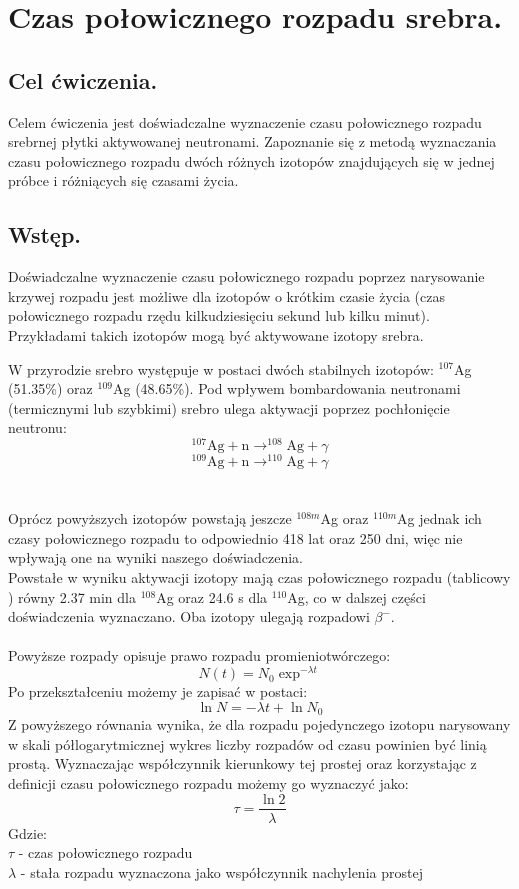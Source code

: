 \documentclass{article}
\begin{document}
\section{Czas połowicznego rozpadu srebra.}
\subsection{Cel ćwiczenia.}
   Celem ćwiczenia jest doświadczalne wyznaczenie czasu połowicznego rozpadu srebrnej płytki aktywowanej neutronami.
   Zapoznanie się z metodą wyznaczania czasu połowicznego rozpadu dwóch różnych izotopów znajdujących się w jednej próbce i różniących się czasami życia.

\subsection{Wstęp.}
Doświadczalne wyznaczenie czasu połowicznego rozpadu poprzez narysowanie krzywej rozpadu jest możliwe dla izotopów o krótkim czasie życia (czas połowicznego rozpadu rzędu kilkudziesięciu sekund lub kilku minut).
Przykładami takich izotopów mogą być aktywowane izotopy srebra.

W przyrodzie srebro występuje w postaci dwóch stabilnych izotopów: $^{107}$Ag (51.35\%) oraz $^{109}$Ag (48.65\%). Pod wpływem bombardowania neutronami (termicznymi lub szybkimi) srebro ulega aktywacji poprzez pochłonięcie neutronu:\\
\[^{107}\text{Ag} + \text{n} \to ^{108}\text{Ag} + \gamma
\]
\[^{109}\text{Ag} + \text{n} \to ^{110}\text{Ag} + \gamma
\]\\\\
Oprócz powyższych izotopów powstają jeszcze $^{108m}$Ag oraz $^{110m}$Ag jednak ich czasy połowicznego rozpadu to odpowiednio 418 lat oraz 250 dni, więc nie wpływają one na wyniki naszego doświadczenia.\\
Powstałe w wyniku aktywacji izotopy mają czas połowicznego rozpadu (tablicowy \cite{1}) równy 2.37 min dla $^{108}$Ag oraz 24.6 s dla $^{110}$Ag, co w dalszej części doświadczenia wyznaczano. Oba izotopy ulegają rozpadowi $\beta ^-$. \\\\
Powyższe rozpady opisuje prawo rozpadu promieniotwórczego:
\begin{equation}
N(t) = N_0 \exp^{-\lambda t}
\end{equation}
Po przekształceniu możemy je zapisać w postaci:
\begin{equation}
\ln N = -\lambda t + \ln N_0
\label{wz_rozpad_log}
\end{equation}
Z powyższego równania wynika, że dla rozpadu pojedynczego izotopu narysowany w skali półlogarytmicznej wykres liczby rozpadów od czasu powinien być linią prostą. Wyznaczając współczynnik kierunkowy tej prostej oraz korzystając z definicji czasu połowicznego rozpadu możemy go wyznaczyć jako:
\begin{equation}
\tau = \frac{\ln 2}{\lambda}
\label{wz_tau}
\end{equation}
Gdzie:\\
$\tau$ - czas połowicznego rozpadu\\
$\lambda $ - stała rozpadu wyznaczona jako współczynnik nachylenia prostej\\
\end{document}
